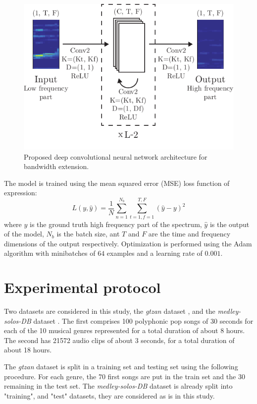 \documentclass{article}
\begin{document}
\begin{figure}[th]
    \centering
    \includegraphics[width=\columnwidth]{figures/mdl.pdf}
    \caption{Proposed deep convolutional neural network architecture for bandwidth extension.}\label{fig:mdl}
\end{figure}

The model is trained using the mean squared error (MSE) loss function of expression:
\begin{equation}
L(y, \hat y) = \frac{1}{N}\sum\limits_{n=1}^{N_b}\sum\limits_{t=1, f=1}^{T, F}(\hat y - y)^2
\end{equation}
where $y$ is the ground truth high frequency part of the spectrum, $\hat y$ is the output of the model, $N_b$ is the batch size, ant $T$ and $F$ are the time and frequency dimensions of the output respectively. Optimization is performed using the Adam \cite{kingma2014adam} algorithm with minibatches of $64$ examples and a learning rate of $0.001$.


\section{Experimental protocol}
\label{sec:protocol}

Two datasets are considered in this study, the \textit{gtzan} dataset \cite{tzanetakis2002musical}, and the \textit{medley-solos-DB} dataset \cite{lostanlen2016deep}. The first comprises 100 polyphonic pop songs of 30 seconds for each of the 10 musical genres represented for a total duration of about 8 hours. The second has 21572 audio clips of about 3 seconds, for a total duration of about 18 hours.

The \textit{gtzan} dataset is split in a training set and testing set using the following procedure. For each genre, the 70 first songs are put in the train set and the 30 remaining in the test set. The \textit{medley-solos-DB} dataset is already split into "training", and "test" datasets, they are considered as is in this study.
\end{document}
